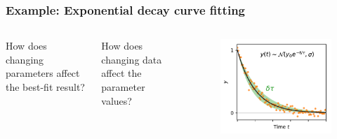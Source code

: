 \documentclass[xcolor={dvipsnames}]{beamer}
\begin{document}
\begin{frame}
\frametitle{Example: Exponential decay curve fitting}
\begin{columns}
        \begin{block}{}
        How does changing parameters affect the best-fit result?
        \end{block}
        \begin{block}{}
        How does changing data affect the parameter values?
        \end{block}

    \begin{figure}
        \includegraphics[width=\textwidth]{figs/dtau.pdf}
    \end{figure}

\end{columns}
\end{frame}
\end{document}
